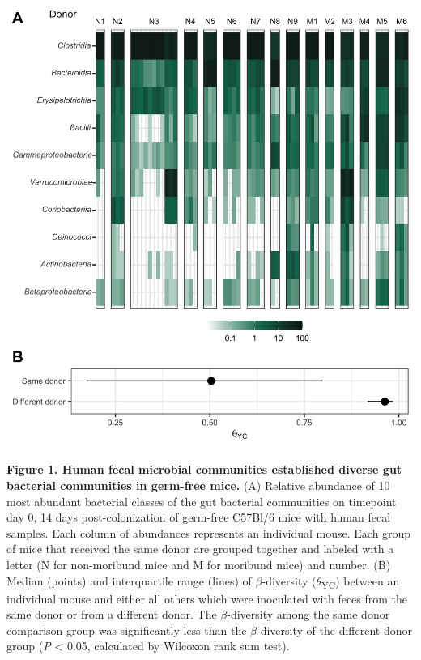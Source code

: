 \documentclass[
  12pt,
]{article}
\begin{document}
\newpage

\includegraphics{../results/figures/figure_1.jpg}

\textbf{Figure 1. Human fecal microbial communities established diverse
gut bacterial communities in germ-free mice.} (A) Relative abundance of
10 most abundant bacterial classes of the gut bacterial communities on
timepoint day 0, 14 days post-colonization of germ-free C57Bl/6 mice
with human fecal samples. Each column of abundances represents an
individual mouse. Each group of mice that received the same donor are
grouped together and labeled with a letter (N for non-moribund mice and
M for moribund mice) and number. (B) Median (points) and interquartile
range (lines) of \(\beta\)-diversity (\(\theta\)\textsubscript{YC})
between an individual mouse and either all others which were inoculated
with feces from the same donor or from a different donor. The
\(\beta\)-diversity among the same donor comparison group was
significantly less than the \(\beta\)-diversity of the different donor
group (\emph{P} \textless{} 0.05, calculated by Wilcoxon rank sum test).

\hfill\break
\end{document}

